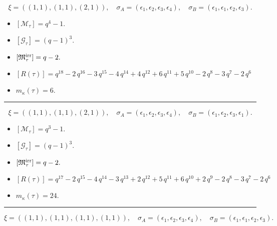 \documentclass[10pt,a4paper]{amsart}
\begin{document}
$$\xi = ({(1, 1), (1, 1)}, {(2, 1)}),\quad \sigma_A = ({{\epsilon_1}, {\epsilon_2}}, {{\epsilon_3, \epsilon_4}}),\quad \sigma_B = ({{\epsilon_1}, {\epsilon_1}}, {{\epsilon_2, \epsilon_3}}).$$

\begin{itemize}
 \item $[\mathcal{M}_{\tau}] = q^{4} - 1 .$

 \item $[\mathcal{G}_{\tau}] = {\left(q - 1\right)}^{3} .$

 \item $[{\frak M}_{\tau}^{\textrm{irr}}] = q - 2 .$

 \item $[R(\tau)] = q^{18} - 2 \, q^{16} - 3 \, q^{15} - 4 \, q^{14} + 4 \, q^{12} + 6 \, q^{11} + 5 \, q^{10} - 2 \, q^{8} - 3 \, q^{7} - 2 \, q^{6} $

 \item $m_{\kappa}(\tau) = 6 .$

 \end{itemize}
\noindent\rule{8cm}{0.4pt}

$$\xi = ({(1, 1), (1, 1)}, {(2, 1)}),\quad \sigma_A = ({{\epsilon_1}, {\epsilon_2}}, {{\epsilon_3, \epsilon_4}}),\quad \sigma_B = ({{\epsilon_1}, {\epsilon_2}}, {{\epsilon_3, \epsilon_1}}).$$

\begin{itemize}
 \item $[\mathcal{M}_{\tau}] = q^{3} - 1 .$

 \item $[\mathcal{G}_{\tau}] = {\left(q - 1\right)}^{3} .$

 \item $[{\frak M}_{\tau}^{\textrm{irr}}] = q - 2 .$

 \item $[R(\tau)] = q^{17} - 2 \, q^{15} - 4 \, q^{14} - 3 \, q^{13} + 2 \, q^{12} + 5 \, q^{11} + 6 \, q^{10} + 2 \, q^{9} - 2 \, q^{8} - 3 \, q^{7} - 2 \, q^{6} $

 \item $m_{\kappa}(\tau) = 24 .$

 \end{itemize}
\noindent\rule{8cm}{0.4pt}

$$\xi = ({(1, 1), (1, 1)}, {(1, 1), (1, 1)}),\quad \sigma_A = ({{\epsilon_1}, {\epsilon_2}}, {{\epsilon_3}, {\epsilon_4}}),\quad \sigma_B = ({{\epsilon_1}, {\epsilon_1}}, {{\epsilon_2}, {\epsilon_3}}).$$
\end{document}
